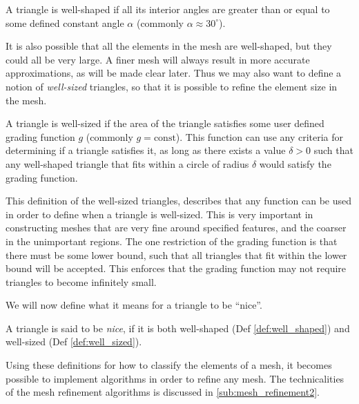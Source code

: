 \documentclass[../fem.tex]{subfile}
\begin{document}
\begin{definition} \label{def:well_shaped}
  A triangle is well-shaped if all its interior angles are greater than or
  equal to some defined constant angle $\alpha$ (commonly
  $\alpha\approx30^\circ$).
\end{definition}

It is also possible that all the elements in the mesh are well-shaped, but they
could all be very large. A finer mesh will always result in more accurate
approximations, as will be made clear later. Thus we may also want to define a
notion of \textit{well-sized} triangles, so that it is possible to refine the
element size in the mesh.

\begin{definition} \label{def:well_sized}
  A triangle is well-sized if the area of the triangle satisfies some user
  defined grading function $g$ (commonly $g=\text{const}$). This function can
  use any criteria for determining if a triangle satisfies it, as long as there
  exists a value $\delta>0$ such that any well-shaped triangle that fits within
  a circle of radius $\delta$ would satisfy the grading function.
\end{definition}

This definition of the well-sized triangles, describes that any function can be
used in order to define when a triangle is well-sized. This is very important
in constructing meshes that are very fine around specified features, and the
coarser in the unimportant regions. The one restriction of the grading function
is that there must be some lower bound, such that all triangles that fit within
the lower bound will be accepted. This enforces that the grading function may
not require triangles to become infinitely small.

We will now define what it means for a triangle to be ``nice''.

\begin{definition}[nice] \label{def:nice_tri}
  A triangle is said to be \textit{nice}, if it is both well-shaped (Def
  \ref{def:well_shaped}) and well-sized (Def \ref{def:well_sized}).
\end{definition}

Using these definitions for how to classify the elements of a mesh, it becomes
possible to implement algorithms in order to refine any mesh. The
technicalities of the mesh refinement algorithms is discussed in
\ref{sub:mesh_refinement2}.
\end{document}
